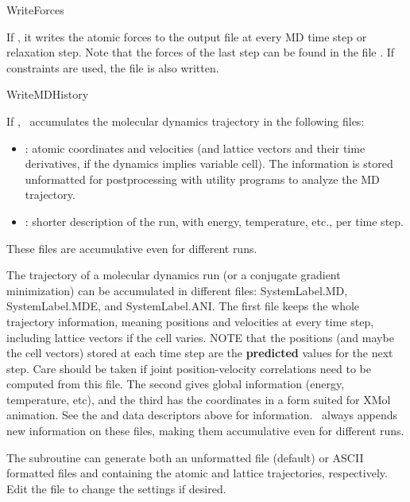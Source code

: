 \begin{fdflogicalF}{WriteForces}

  If \fdftrue, it writes the atomic forces to the output file at every
  MD time step or relaxation step.  Note that the forces of the last
  step can be found in the file . If constraints are used,
  the file  is also written.

\end{fdflogicalF}

\begin{fdflogicalF}{WriteMDHistory}

  If \fdftrue, \siesta\ accumulates the molecular dynamics trajectory
  in the following files:
  \begin{itemize}
    \item%
     : atomic coordinates and velocities (and lattice
    vectors and their time derivatives, if the dynamics implies
    variable cell). The information is stored unformatted for
    postprocessing with utility programs to analyze the MD trajectory.

    \item%
     : shorter description of the run, with energy,
    temperature, etc., per time step.

  \end{itemize}
  These files are accumulative even for different runs.


  The trajectory of a molecular dynamics run (or a conjugate gradient
  minimization) can be accumulated in different files: SystemLabel.MD,
  SystemLabel.MDE, and SystemLabel.ANI. The first file keeps the whole
  trajectory information, meaning positions and velocities at every time
  step, including lattice vectors if the cell varies. NOTE that the
  positions (and maybe the cell vectors) stored at each time step are
  the \textbf{predicted} values for the next step. Care should be taken if
  joint position-velocity correlations need to be computed from this
  file.  The second gives global information (energy, temperature, etc),
  and the third has the coordinates in a form suited for XMol animation.
  See the  and  data descriptors
  above for information. \siesta\ always appends new information on
  these files, making them accumulative even for different runs.

  The  subroutine can generate both an unformatted file
   (default) or ASCII formatted files  and
   containing the atomic and lattice trajectories,
  respectively. Edit the file to change the settings if desired.

\end{fdflogicalF}


